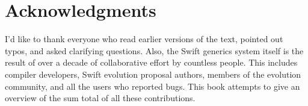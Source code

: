 \documentclass[../generics]{subfiles}
\begin{document}
\section*{Acknowledgments}

I'd like to thank everyone who read earlier versions of the text, pointed out typos, and asked clarifying questions. Also, the Swift generics system itself is the result of over a decade of collaborative effort by countless people. This includes compiler developers, Swift evolution proposal authors, members of the evolution community, and all the users who reported bugs. This book attempts to give an overview of the sum total of all these contributions.
\end{document}
